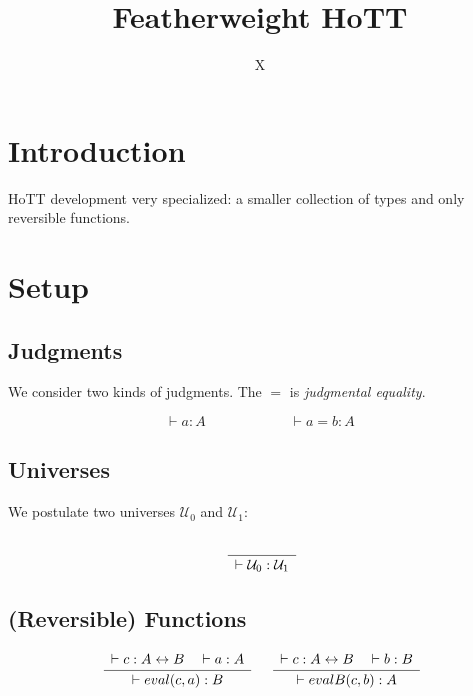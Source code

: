 \documentclass[format=acmlarge,review,natbib]{acmart}
\newcommand{\evalone}[2]{eval(#1,#2)}
\newcommand{\evalbone}[2]{evalB(#1,#2)}
\newcommand{\iso}{\leftrightarrow}
\newcommand{\uzero}{\mathcal{U}_0}
\newcommand{\uone}{\mathcal{U}_1}
\newcommand{\Rule}[2]{
\makebox{
$\displaystyle
\frac{\begin{array}{l}#1\\\end{array}}
{\begin{array}{l}#2\\\end{array}}$}}
\newcommand{\proves}{\vdash}
\newcommand{\jdg}[3]{#1 \proves #2 : #3}
\begin{document}
\title{Featherweight HoTT}

\author{X}

\begin{abstract}
\end{abstract}

\maketitle

\section{Introduction}

HoTT development very specialized: a smaller collection of types and only
reversible functions.

\section{Setup}

\subsection{Judgments}

We consider two kinds of judgments. The $=$ is \emph{judgmental equality}.

\[
\jdg{}{a}{A} \qquad\qquad\qquad \jdg{}{a = b}{A}
\]

\subsection{Universes}

We postulate two universes $\uzero$ and $\uone$:

\[
\Rule{}{\jdg{}{\uzero}{\uone}}
\]

\subsection{(Reversible) Functions}

\[\begin{array}{c}
\Rule{\jdg{}{c}{A \iso B}
         \quad\jdg{}{a}{A}}
        {\jdg{}{\evalone{c}{a}}{B}}
\quad
\Rule{\jdg{}{c}{A \iso B}
         \quad\jdg{}{b}{B}}
        {\jdg{}{\evalbone{c}{b}}{A}}
\end{array}\]
\end{document}
